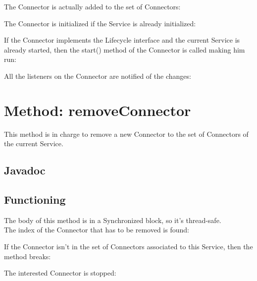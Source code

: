\documentclass[../../codeInspection.tex]{subfiles}
\begin{document}
			The Connector is actually added to the set of Connectors:
			

			The Connector is initialized if the Service is already initialized:
			

			If the Connector implements the Lifecycle interface and the current Service is already started, then the start() method of the Connector is called making him run:
			

			All the listeners on the Connector are notified of the changes:
			

	\section{Method: removeConnector}

		This method is in charge to remove a new Connector to the set of Connectors of the current Service.

		\subsection{Javadoc}
			

		\subsection{Functioning}
			The body of this method is in a Synchronized block, so it's thread-safe.\\

			The index of the Connector that has to be removed is found:
			

			If the Connector isn't in the set of Connectors associated to this Service, then the method breaks:
			

			The interested Connector is stopped:
			
\end{document}

